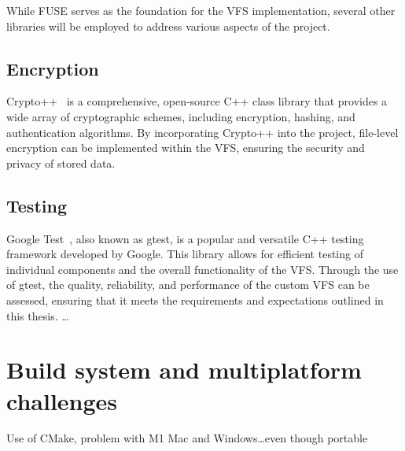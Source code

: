While FUSE serves as the foundation for the VFS implementation, several other libraries will be employed to address various aspects of the project.

\subsection{Encryption}\label{subsec:encryption-analysis}

Crypto++~\cite{crypto_pp} is a comprehensive, open-source C++ class library that provides a wide array of cryptographic schemes, including encryption, hashing, and authentication algorithms.
By incorporating Crypto++ into the project, file-level encryption can be implemented within the VFS, ensuring the security and privacy of stored data.

\subsection{Testing}\label{subsec:gtest}

Google Test~\cite{google_test}, also known as gtest, is a popular and versatile C++ testing framework developed by Google.
This library allows for efficient testing of individual components and the overall functionality of the VFS. Through the use of gtest, the quality, reliability, and performance of the custom VFS can be assessed, ensuring that it meets the requirements and expectations outlined in this thesis.
\ldots

\section{Build system and multiplatform challenges}\label{sec:build-system-and-multiplatform-challenges}

Use of CMake, problem with M1 Mac and Windows\ldots even though portable